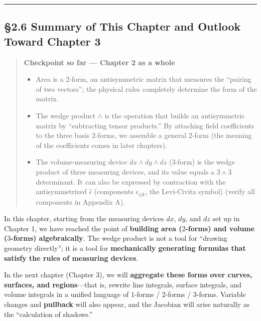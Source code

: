 \begin{center}\rule{0.5\linewidth}{0.5pt}\end{center}

\hypertarget{summary-of-this-chapter-and-outlook-toward-chapter-3}{%
\subsection{§2.6 Summary of This Chapter and Outlook Toward Chapter
3}\label{summary-of-this-chapter-and-outlook-toward-chapter-3}}

\begin{quote}
\textbf{Checkpoint so far — Chapter 2 as a whole}

\begin{itemize}
\item
  Area is a \(2\)-form, an antisymmetric matrix that measures the
  ``pairing of two vectors''; the physical rules completely determine
  the form of the matrix.
\item
  The wedge product \(\wedge\) is the operation that builds an
  antisymmetric matrix by ``subtracting tensor products.'' By attaching
  field coefficients to the three basis \(2\)-forms, we assemble a
  general \(2\)-form (the meaning of the coefficients comes in later
  chapters).
\item
  The volume-measuring device \(dx \wedge dy \wedge dz\) (\(3\)-form) is
  the wedge product of three measuring devices, and its value equals a
  \(3 \times 3\) determinant. It can also be expressed by contraction
  with the antisymmetrized \(\widehat{\epsilon}\) (components
  \(\epsilon_{ijk}\), the Levi-Civita symbol) (verify all components in
  Appendix A).
\end{itemize}
\end{quote}

In this chapter, starting from the measuring devices \(dx\), \(dy\), and
\(dz\) set up in Chapter 1, we have reached the point of
\textbf{building area (\(2\)-forms) and volume (\(3\)-forms)
algebraically}. The wedge product is not a tool for ``drawing geometry
directly''; it is a tool for
\textbf{mechanically generating formulas that satisfy the rules of measuring devices}.

In the next chapter (Chapter 3), we will
\textbf{aggregate these forms over curves, surfaces, and regions}---that
is, rewrite line integrals, surface integrals, and volume integrals in a
unified language of \(1\)-forms / \(2\)-forms / \(3\)-forms. Variable
changes and \textbf{pullback} will also appear, and the Jacobian will
arise naturally as the ``calculation of shadows.''

